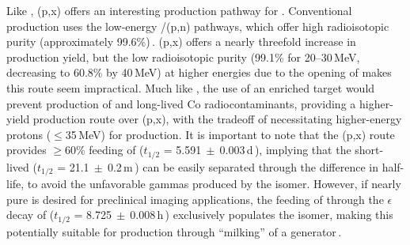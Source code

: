 % 

Like , (p,x) offers an interesting production pathway for  .
Conventional production uses the low-energy /(p,n) pathways, which offer high radioisotopic purity (approximately 99.6\%)\,\cite{Graves2015,Wooten2015}.
(p,x) offers a nearly threefold increase in production yield, but the low radioisotopic purity (99.1\% for 20--30\,MeV, decreasing to 60.8\% by 40\,MeV) at higher energies due to the opening of  makes this route seem impractical.
Much like , the use of an enriched  target would prevent production of  and long-lived Co radiocontaminants, providing a higher-yield production route over   (p,x), with the tradeoff of necessitating higher-energy protons ($\leq$35\,MeV) for production.
It is important to note that the (p,x) route provides $\geq$60\% feeding of  ($t_{1/2}$ = 5.591$~\pm~$0.003\,d\,\cite{Dong2015}), implying that the short-lived   ($t_{1/2}$ = 21.1$~\pm~$0.2\,m\,\cite{Dong2015}) can be easily separated through the difference in half-life, to avoid the unfavorable gammas produced by the isomer. 
However, if nearly pure  is desired for preclinical imaging applications, the feeding of  through the $\epsilon$ decay of  ($t_{1/2}$ = 8.725$~\pm~$0.008\,h\,\cite{Dong2015}) exclusively populates the isomer, making this potentially suitable for production through \enquote{milking} of a  generator\,\cite{Blauenstein1997}.








